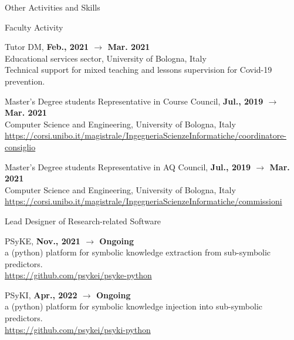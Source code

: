 \documentclass{resume} %
\begin{document}
    \begin{rSection}{Other Activities and Skills}


        \begin{rSubsection}{Faculty Activity}{}{}{}
            \item Tutor DM, \textbf{Feb., 2021 $\rightarrow$ Mar. 2021}
            \\Educational services sector, University of Bologna, Italy
            \\Technical support for mixed teaching and lessons supervision for Covid-19 prevention.
            \item Master's Degree students Representative in Course Council, \textbf{Jul., 2019 $\rightarrow$ Mar. 2021}
            \\Computer Science and Engineering, University of Bologna, Italy
            \\\url{https://corsi.unibo.it/magistrale/IngegneriaScienzeInformatiche/coordinatore-consiglio}
            \item Master's Degree students Representative in AQ Council, \textbf{Jul., 2019 $\rightarrow$ Mar. 2021}
            \\Computer Science and Engineering, University of Bologna, Italy
            \\\url{https://corsi.unibo.it/magistrale/IngegneriaScienzeInformatiche/commissioni}
        \end{rSubsection}


        \begin{rSubsection}{Lead Designer of Research-related Software}{}{}{}
            \item PSyKE, \textbf{Nov., 2021 $\rightarrow$ Ongoing}
            \\a (python) platform for symbolic knowledge extraction from sub-symbolic predictors.
            \\\url{https://github.com/psykei/psyke-python}
            \item PSyKI, \textbf{Apr., 2022 $\rightarrow$ Ongoing}
            \\a (python) platform for symbolic knowledge injection into sub-symbolic predictors.
            \\\url{https://github.com/psykei/psyki-python}
        \end{rSubsection}


\end{rSection}
\end{document}

